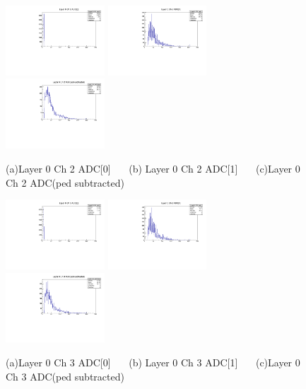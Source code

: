 \documentclass[a4paper,11pt]{article}
\theoremstyle{mytheor}
\begin{document}
\begin{figure}[H] 
\vspace*{-0.3cm} 
\includegraphics[width=0.33\textwidth,scale=0.5,trim=0 0 0 0,clip]{plotsdir/file0_muons-Layer0_Ch2_adc0-1.pdf} 
\includegraphics[width=0.33\textwidth,scale=0.5,trim=0 0 0 0,clip]{plotsdir/file0_muons-Layer0_Ch2_adc1-1.pdf} 
\includegraphics[width=0.33\textwidth,scale=0.5,trim=0 0 0 0,clip]{plotsdir/file0_muons-Layer0_Ch2_adcPedsub-1.pdf} 
\caption{(a)Layer 0 Ch 2 ADC[0] ~~~(b) Layer 0 Ch 2 ADC[1] ~~~(c)Layer 0 Ch 2 ADC(ped subtracted) } 
\end{figure} 
\begin{figure}[H] 
\vspace*{-0.3cm} 
\includegraphics[width=0.33\textwidth,scale=0.5,trim=0 0 0 0,clip]{plotsdir/file0_muons-Layer0_Ch3_adc0-1.pdf} 
\includegraphics[width=0.33\textwidth,scale=0.5,trim=0 0 0 0,clip]{plotsdir/file0_muons-Layer0_Ch3_adc1-1.pdf} 
\includegraphics[width=0.33\textwidth,scale=0.5,trim=0 0 0 0,clip]{plotsdir/file0_muons-Layer0_Ch3_adcPedsub-1.pdf} 
\caption{(a)Layer 0 Ch 3 ADC[0] ~~~(b) Layer 0 Ch 3 ADC[1] ~~~(c)Layer 0 Ch 3 ADC(ped subtracted) } 
\end{figure} 
\end{document}

